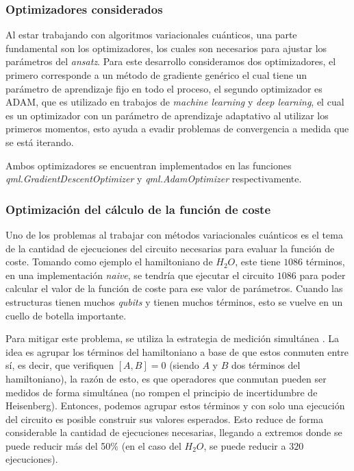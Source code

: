 %
%
%
%
%

\subsubsection{Optimizadores considerados}
Al estar trabajando con algoritmos variacionales cuánticos, una parte fundamental son los optimizadores, los cuales son necesarios para ajustar los parámetros del \textit{ansatz}. Para este desarrollo consideramos dos optimizadores, el primero corresponde a un método de gradiente genérico el cual tiene un parámetro de aprendizaje fijo en todo el proceso, el segundo optimizador es ADAM, que es utilizado en trabajos de \textit{machine learning} y \textit{deep learning}, el cual es un optimizador con un parámetro de aprendizaje adaptativo al utilizar los primeros momentos, esto ayuda a evadir problemas de convergencia a medida que se está iterando. 

Ambos optimizadores se encuentran implementados en las funciones \textit{qml.GradientDescentOptimizer} y \textit{qml.AdamOptimizer} respectivamente.


%
%
%
%
%
\subsubsection{Optimización del cálculo de la función de coste}
Uno de los problemas al trabajar con métodos variacionales cuánticos es el tema de la cantidad de ejecuciones del circuito necesarias para evaluar la función de coste. Tomando como ejemplo el hamiltoniano de $H_2O$, este tiene $1086$ términos, en una implementación \textit{naive}, se tendría que ejecutar el circuito $1086$ para poder calcular el valor de la función de coste para ese valor de parámetros. Cuando las estructuras tienen muchos \textit{qubits} y tienen muchos términos, esto se vuelve en un cuello de botella importante.

Para mitigar este problema, se utiliza la estrategia de medición simultánea \cite{MedicionSimultanea}. La idea es agrupar los términos del hamiltoniano a base de que estos conmuten entre sí, es decir, que verifiquen $[A,B]=0$ (siendo $A$ y $B$ dos términos del hamiltoniano), la razón de esto, es que operadores que conmutan pueden ser medidos de forma simultánea (no rompen el principio de incertidumbre de Heisenberg). Entonces, podemos agrupar estos términos y con solo una ejecución del circuito es posible construir sus valores esperados. Esto reduce de forma considerable la cantidad de ejecuciones necesarias, llegando a extremos donde se puede reducir más del 50\% (en el caso del $H_2O$, se puede reducir a $320$ ejecuciones).

